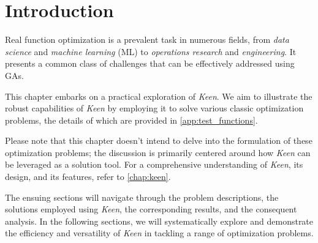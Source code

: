 \section{Introduction}
\label{sec:fn_opt:intro}
  Real function optimization is a prevalent task in numerous fields, from 
  \textit{data science} and \textit{machine learning} (ML) to 
  \textit{operations research} and \textit{engineering}.
  It presents a common class of challenges that can be effectively addressed
  using GAs.

  This chapter embarks on a practical exploration of \textit{Keen}.
  We aim to illustrate the robust capabilities of \textit{Keen} by employing
  it to solve various classic optimization problems, the details of which are
  provided in \vref{app:test_functions}.

  Please note that this chapter doesn't intend to delve into the formulation
  of these optimization problems; the discussion is primarily centered around
  how \textit{Keen} can be leveraged as a solution tool.
  For a comprehensive understanding of \textit{Keen}, its design, and its
  features, refer to \vref{chap:keen}.
  
  The ensuing sections will navigate through the problem descriptions, the
  solutions employed using \textit{Keen}, the corresponding results, and the
  consequent analysis.
  In the following sections, we will systematically explore and demonstrate
  the efficiency and versatility of \textit{Keen} in tackling a range of
  optimization problems.
